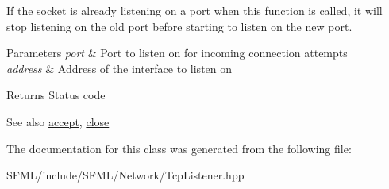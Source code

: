 If the socket is already listening on a port when this function is called, it will stop listening on the old port before starting to listen on the new port.


\begin{DoxyParams}{Parameters}
{\em port} & Port to listen on for incoming connection attempts \\
\hline
{\em address} & Address of the interface to listen on\\
\hline
\end{DoxyParams}
\begin{DoxyReturn}{Returns}
Status code
\end{DoxyReturn}
\begin{DoxySeeAlso}{See also}
\mbox{\hyperlink{classsf_1_1_tcp_listener_ae2c83ce5a64d50b68180c46bef0a7346}{accept}}, \mbox{\hyperlink{classsf_1_1_tcp_listener_a3a00a850506bd0f9f48867a0fe59556b}{close}} \begin{DoxyVerb}\end{DoxyVerb}
 
\end{DoxySeeAlso}


The documentation for this class was generated from the following file\+:\begin{DoxyCompactItemize}
\item 
S\+F\+M\+L/include/\+S\+F\+M\+L/\+Network/Tcp\+Listener.\+hpp\end{DoxyCompactItemize}
